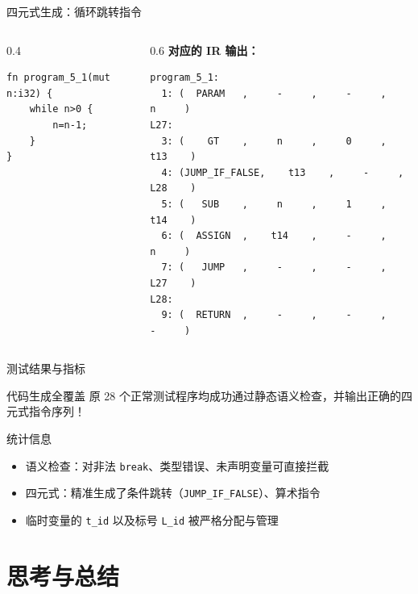\documentclass[aspectratio=169]{ctexbeamer}
\begin{document}
\begin{frame}[fragile]{四元式生成：循环跳转指令}
    \begin{columns}[T]
    \begin{column}{0.4\textwidth}
\begin{lstlisting}[language=RustLike, basicstyle=\tiny\ttfamily]
fn program_5_1(mut n:i32) {
    while n>0 {
        n=n-1;
    }
}
\end{lstlisting}
    \end{column}
    \begin{column}{0.6\textwidth}
    \textbf{对应的 IR 输出：}
\begin{lstlisting}[basicstyle=\tiny\ttfamily,numbers=none]
program_5_1:
  1: (  PARAM   ,     -     ,     -     ,     n     )
L27:
  3: (    GT    ,     n     ,     0     ,    t13    )
  4: (JUMP_IF_FALSE,    t13    ,     -     ,    L28    )
  5: (   SUB    ,     n     ,     1     ,    t14    )
  6: (  ASSIGN  ,    t14    ,     -     ,     n     )
  7: (   JUMP   ,     -     ,     -     ,    L27    )
L28:
  9: (  RETURN  ,     -     ,     -     ,     -     )
\end{lstlisting}
    \end{column}
    \end{columns}
\end{frame}



\begin{frame}{测试结果与指标}
    \begin{alertblock}{代码生成全覆盖}
        原 28 个正常测试程序均成功通过静态语义检查，并输出正确的四元式指令序列！
    \end{alertblock}
    \vfill
    \begin{block}{统计信息}
        \begin{itemize}
            \item 语义检查：对非法 \texttt{break}、类型错误、未声明变量可直接拦截
            \item 四元式：精准生成了条件跳转（\texttt{JUMP\_IF\_FALSE}）、算术指令
            \item 临时变量的 \texttt{t\_id} 以及标号 \texttt{L\_id} 被严格分配与管理
        \end{itemize}
    \end{block}
\end{frame}

\section{思考与总结}
\end{document}
